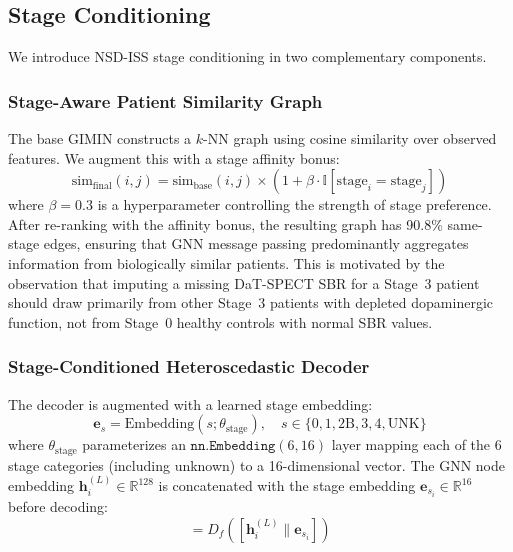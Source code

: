 \subsection{Stage Conditioning}
\label{p2:sec:stage_conditioning}

We introduce NSD-ISS stage conditioning in two complementary components.

\subsubsection{Stage-Aware Patient Similarity Graph}
The base GIMIN constructs a $k$-NN graph using cosine similarity over observed features. We augment this with a stage affinity bonus:
\begin{equation}
\text{sim}_{\text{final}}(i,j) = \text{sim}_{\text{base}}(i,j) \times \left(1 + \beta \cdot \mathbb{I}[\text{stage}_i = \text{stage}_j]\right)
\label{p2:eq:stage_graph}
\end{equation}
where $\beta = 0.3$ is a hyperparameter controlling the strength of stage preference. After re-ranking with the affinity bonus, the resulting graph has 90.8\% same-stage edges, ensuring that GNN message passing predominantly aggregates information from biologically similar patients. This is motivated by the observation that imputing a missing DaT-SPECT SBR for a Stage~3 patient should draw primarily from other Stage~3 patients with depleted dopaminergic function, not from Stage~0 healthy controls with normal SBR values.

\subsubsection{Stage-Conditioned Heteroscedastic Decoder}
The decoder is augmented with a learned stage embedding:
\begin{equation}
\mathbf{e}_s = \text{Embedding}(s; \theta_{\text{stage}}), \quad s \in \{0, 1, 2\text{B}, 3, 4, \text{UNK}\}
\label{p2:eq:stage_emb}
\end{equation}
where $\theta_{\text{stage}}$ parameterizes an $\texttt{nn.Embedding}(6, 16)$ layer mapping each of the 6 stage categories (including unknown) to a 16-dimensional vector. The GNN node embedding $\mathbf{h}_i^{(L)} \in \mathbb{R}^{128}$ is concatenated with the stage embedding $\mathbf{e}_{s_i} \in \mathbb{R}^{16}$ before decoding:
\begin{equation}
[\hat{\mu}_f, \log\hat{\sigma}_f^2] = D_f([\mathbf{h}_i^{(L)} \| \mathbf{e}_{s_i}])
\label{p2:eq:stage_decoder}
\end{equation}

